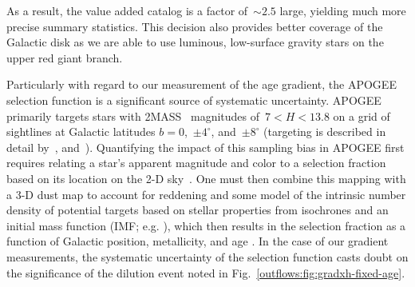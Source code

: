As a result, the value added catalog is a factor of~$\sim$$2.5$ large, yielding
much more precise summary statistics.
This decision also provides better coverage of the Galactic disk as we are able
to use luminous, low-surface gravity stars on the upper red giant branch.
\par
Particularly with regard to our measurement of the age gradient, the APOGEE
selection function is a significant source of systematic uncertainty.
APOGEE primarily targets stars with 2MASS~\citep{Skrutskie2006} magnitudes
of~$7 < H < 13.8$ on a grid of sightlines at Galactic latitudes
$b = 0$,~$\pm 4^\circ$, and~$\pm 8^\circ$ (targeting is described in detail
by~\citealt{Zasowski2013, Zasowski2017, Beaton2021}, and~\citealt{Santana2021}).
Quantifying the impact of this sampling bias in APOGEE first requires relating
a star's apparent magnitude and color to a selection fraction based on its
location on the 2-D sky~\citep{Bovy2016c, Mackereth2017, Lian2022}.
One must then combine this mapping with a 3-D dust map to account for reddening
and some model of the intrinsic number density of potential targets based on
stellar properties from isochrones and an initial mass function (IMF; e.g.
\citealt{Kroupa2001, Chabrier2003}), which then results in the selection
fraction as a function of Galactic position, metallicity, and age
\citep[see also][]{Mackereth2020}.
In the case of our gradient measurements, the systematic uncertainty of the
selection function casts doubt on the significance of the dilution event
noted in Fig.~\ref{outflows:fig:gradxh-fixed-age}.



